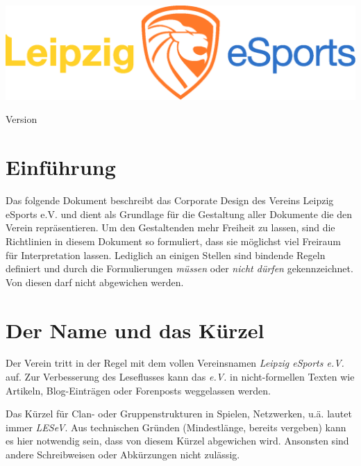 \documentclass{article}
\begin{document}
\begin{titlepage}
\vspace*{\fill}
\title{\titel}
\author{\autor}
\includegraphics[width=\textwidth]{Docs/Logo.eps}
{\let\newpage\relax\maketitle}
\begin{center}
Version \version
\end{center}
\vspace*{\fill}
\end{titlepage}

\cleardoublepage

\tableofcontents

\cleardoublepage
\section{Einführung}

Das folgende Dokument beschreibt das Corporate Design des Vereins Leipzig eSports e.V. und dient als Grundlage für die Gestaltung aller Dokumente die den Verein repräsentieren.
Um den Gestaltenden mehr Freiheit zu lassen, sind die Richtlinien in diesem Dokument so formuliert, dass sie möglichst viel Freiraum für Interpretation lassen.
Lediglich an einigen Stellen sind bindende Regeln definiert und durch die Formulierungen \emph{müssen} oder \emph{nicht dürfen} gekennzeichnet.
Von diesen darf nicht abgewichen werden.

\cleardoublepage
\section{Der Name und das Kürzel}

Der Verein tritt in der Regel mit dem vollen Vereinsnamen \emph{Leipzig eSports e.V.} auf.
Zur Verbesserung des Leseflusses kann das \emph{e.V.} in nicht-formellen Texten wie Artikeln, Blog-Einträgen oder Forenposts weggelassen werden.

Das Kürzel für Clan- oder Gruppenstrukturen in Spielen, Netzwerken, u.ä. lautet immer \emph{LESeV}.
Aus technischen Gründen (Mindestlänge, bereits vergeben) kann es hier notwendig sein, dass von diesem Kürzel abgewichen wird.
Ansonsten sind andere Schreibweisen oder Abkürzungen nicht zulässig.
\end{document}
